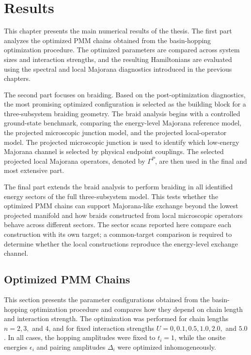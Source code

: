 \chapter{Results}
This chapter presents the main numerical results of the thesis. The first part analyzes the optimized PMM chains obtained from the basin-hopping optimization procedure. The optimized parameters are compared across system sizes and interaction strengths, and the resulting Hamiltonians are evaluated using the spectral and local Majorana diagnostics introduced in the previous chapters.

The second part focuses on braiding. Based on the post-optimization diagnostics, the most promising optimized configuration is selected as the building block for a three-subsystem braiding geometry. The braid analysis begins with a controlled ground-state benchmark, comparing the energy-level Majorana reference model, the projected microscopic junction model, and the projected local-operator model. The projected microscopic junction is used to identify which low-energy Majorana channel is selected by physical endpoint couplings. The selected projected local Majorana operators, denoted by $\Gamma^P$, are then used in the final and most extensive part.


The final part extends the braid analysis to perform braiding in all identified energy sectors of the full three-subsystem model. This tests whether the optimized PMM chains can support Majorana-like exchange beyond the lowest projected manifold and how braids constructed from local microscopic operators behave across different sectors. The sector scans reported here compare each construction with its own target; a common-target comparison is required to determine whether the local constructions reproduce the energy-level exchange channel.



\section{Optimized PMM Chains}

This section presents the parameter configurations obtained from the basin-hopping optimization procedure and compares how they depend on chain length and interaction strength. The optimization was performed for chain lengths $n=2,3,$ and $4$, and for fixed interaction strengths $U=0,0.1,0.5,1.0,2.0,$ and $5.0$. In all cases, the hopping amplitudes were fixed to $t_i=1$, while the onsite energies $\epsilon_i$ and pairing amplitudes $\Delta_i$ were optimized inhomogeneously.

